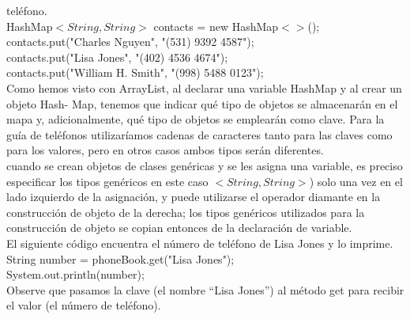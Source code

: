 \documentclass[11pt,a4paper]{article}
\begin{document}
	teléfono.\\
	HashMap$<String, String>$ contacts = new HashMap$<>$();\\
	contacts.put("Charles Nguyen", "(531) 9392 4587");\\
	contacts.put("Lisa Jones", "(402) 4536 4674");\\
	contacts.put("William H. Smith", "(998) 5488 0123");\\
	Como hemos visto con ArrayList, al declarar una variable HashMap y al crear un objeto Hash-
	Map, tenemos que indicar qué tipo de objetos se almacenarán en el mapa y, adicionalmente, qué
	tipo de objetos se emplearán como clave. Para la guía de teléfonos utilizaríamos cadenas de caracteres
	tanto para las claves como para los valores, pero en otros casos ambos tipos serán diferentes.\\
	cuando se crean objetos de clases genéricas y se les asigna
	una variable, es preciso especificar los tipos genéricos en este caso $<String, String>$) solo una
	vez en el lado izquierdo de la asignación, y puede utilizarse el operador diamante en la construcción
	de objeto de la derecha; los tipos genéricos utilizados para la construcción de objeto se copian
	entonces de la declaración de variable.\\
	El siguiente código encuentra el número de teléfono de Lisa Jones y lo imprime.\\
	String number = phoneBook.get("Lisa Jones");\\
	System.out.println(number);\\
	Observe que pasamos la clave (el nombre “Lisa Jones”) al método get para recibir el valor (el
	número de teléfono).
\end{document}
